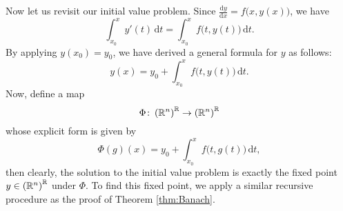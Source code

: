 \documentclass[math, code]{amznotes}
\theoremstyle{remark}
\renewcommand{\d}{\mathrm{d}}
\begin{document}
Now let us revisit our initial value problem. Since $\frac{\d y}{\d x} = f\bigl(x, y(x)\bigr)$, we have 
\begin{equation*}
    \int_{x_0}^x\!y'(t)\,\d t = \int_{x_0}^x\!f\bigl(t, y(t)\bigr)\,\d t.
\end{equation*}
By applying $y(x_0) = y_0$, we have derived a general formula for $y$ as follows:
\begin{equation*}
    y(x) = y_0 + \int_{x_0}^x\!f\bigl(t, y(t)\bigr)\,\d t.
\end{equation*}
Now, define a map 
\begin{equation*}
    \Phi \colon \left(\mathbb{R}^n\right)^{\mathbb{R}} \to \left(\mathbb{R}^n\right)^{\mathbb{R}}
\end{equation*}
whose explicit form is given by 
\begin{equation*}
    \Phi(g)(x) = y_0 + \int_{x_0}^x\!f\bigl(t, g(t)\bigr)\,\d t,
\end{equation*}
then clearly, the solution to the initial value problem is exactly the fixed point $y \in \left(\mathbb{R}^n\right)^{\mathbb{R}}$ under $\Phi$. To find this fixed point, we apply a similar recursive procedure as the proof of Theorem \ref{thm:Banach}.
\end{document}
